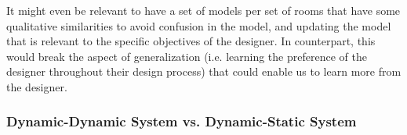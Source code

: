 It might even be relevant to have a set of models per set of rooms that have some qualitative similarities to avoid confusion in the model, and updating the model that is relevant to the specific objectives of the designer. In counterpart, this would break the aspect of generalization (i.e. learning the preference of the designer throughout their design process) that could enable us to learn more from the designer. 





\subsubsection{Dynamic-Dynamic System vs. Dynamic-Static System}

